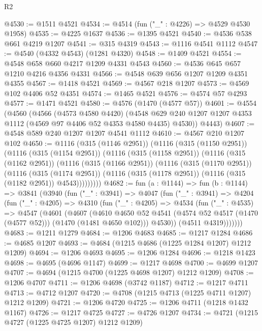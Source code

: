 \begin{lexlean}{R2}
\begin{coremodule}
@4530 := @1511 @4521
@4534 := @4514 (fun ("_" : @4226) => @4529 @4530 @1958)
@4535 := @4225 @1637
@4536 := @1395 @4521
@4540 := @4536 @538 @661 @4219 @1207
@4541 := @315 @4319
@4543 := @1116 @4541 @1112
@4547 := @4540 (@4332 @4543) (@1281 @4320)
@4548 := @1409 @4521
@4554 := @4548 @658 @660 @4217 @1209 @4331 @4543
@4560 := @4536 @645 @657 @1210 @4216 @4356 @4331
@4566 := @4548 @639 @656 @1207 @1209 @4351 @4355
@4567 := @1418 @4521
@4569 := @4567 @218 @1207
@4573 := @4569 @102 @4406 @52 @4351
@4574 := @1465 @4521
@4576 := @4574 @57 @4293
@4577 := @1471 @4521
@4580 := @4576 (@1470 (@4577 @57))
@4601 := @4554
    (@4560
      (@4566
        (@4573 @4580 @4420)
        (@4548 @629 @240 @1207 @1207 @4353 @1112 (@4569 @97 @4406 @52 @4353 @4580 @4435) @4530))
      @4443)
@4607 := @4548 @589 @240 @1207 @1207 @4541 @1112
@4610 := @4567 @210 @1207 @102
@4650 := @1116
    (@315 (@1146 @2951))
    (@1116
      (@315 (@1150 @2951))
      (@1116
        (@315 (@1154 @2951))
        (@1116
          (@315 (@1158 @2951))
          (@1116
            (@315 (@1162 @2951))
            (@1116
              (@315 (@1166 @2951))
              (@1116
                (@315 (@1170 @2951))
                (@1116
                  (@315 (@1174 @2951))
                  (@1116 (@315 (@1178 @2951)) (@1116 (@315 (@1182 @2951)) @4543)))))))))
@4682 := fun (a : @1144) =>
  fun (b : @1144) =>
  @3841
    (@3940
      (fun ("_" : @3941) =>
      @4047
        (fun ("_" : @3941) =>
        @4204
          (fun ("_" : @4205) =>
          @4310
            (fun ("_" : @4205) =>
            @4534
              (fun ("_" : @4535) =>
              @4547
                (@4601
                  (@4607
                    (@4610
                      @4650
                      @52
                      @4541
                      (@4574 @52 @4517 (@1470 (@4577 @52)))
                      (@1470 (@1481 @4650 @102)))
                    @4530))
                (@4511 @4319)))))))
@4683 := @1211 @1279
@4684 := @1206 @4683
@4685 := @1217 @1284
@4686 := @4685 @1207
@4693 := @4684 (@1215 @4686 (@1225 @1284 @1207) @1212 @1209)
@4694 := @1206 @4693
@4695 := @1206 @1284
@4696 := @1218 @1423
@4698 := @4695 (@4696 @1147)
@4699 := @1217 @4698
@4700 := @4699 @1207
@4707 := @4694 (@1215 @4700 (@1225 @4698 @1207) @1212 @1209)
@4708 := @1206 @4707
@4711 := @1206 @4698 (@3742 @1187)
@4712 := @1217 @4711
@4713 := @4712 @1207
@4720 := @4708 (@1215 @4713 (@1225 @4711 @1207) @1212 @1209)
@4721 := @1206 @4720
@4725 := @1206 @4711 (@1218 @1432 @1167)
@4726 := @1217 @4725
@4727 := @4726 @1207
@4734 := @4721 (@1215 @4727 (@1225 @4725 @1207) @1212 @1209)

\end{coremodule}
\end{lexlean}
